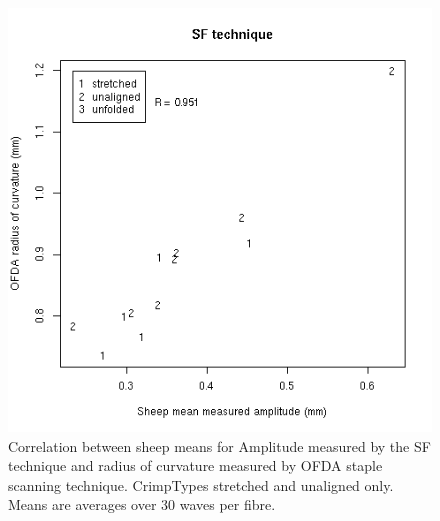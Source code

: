 %

\begin{figure}[!h]
  \centering
  \includegraphics[width=1.0\textwidth]{figofdaradsfamplhelix.png}
  \caption{Correlation between sheep means for Amplitude measured by the SF technique and radius of curvature measured by OFDA staple scanning technique. CrimpTypes stretched and unaligned only. Means are averages over 30 waves per fibre.}
  \label{fig:ofdaradsfamplhelix}
\end{figure}

%

